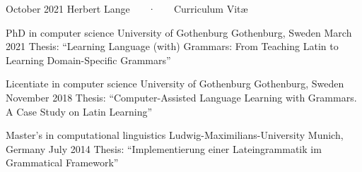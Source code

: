 \documentclass[11pt, a4]{academic-cv}
\begin{document}
\makecvheader
\makecvfooter
{ October 2021 }
{ Herbert Lange ~~~·~~~ Curriculum Vit\ae}
{\thepage}


\vspace{-10px}

\begin{cventries}
\cventry
{PhD in computer science} %
{ University of Gothenburg} %
{Gothenburg, Sweden} %
{March 2021} %
{Thesis: ``Learning Language (with) Grammars: From Teaching Latin to Learning Domain-Specific Grammars''}

\cventry
{Licentiate in computer science} %
{ University of Gothenburg} %
{Gothenburg, Sweden} %
{November 2018} %
{Thesis: ``Computer-Assisted Language Learning with Grammars. A Case Study on Latin Learning''}

\cventry
{Master's in computational linguistics} %
{ Ludwig-Maximilians-University} %
{Munich, Germany} %
{July 2014} %
{Thesis: ``Implementierung einer Lateingrammatik im Grammatical Framework''}


\end{cventries}
\vspace{-10px}
\end{document}

